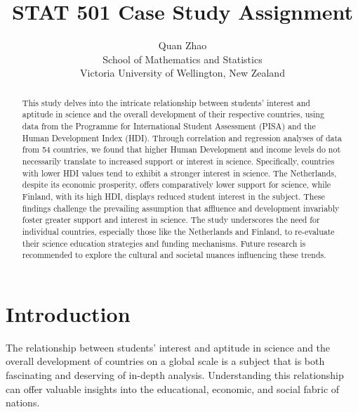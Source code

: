 \documentclass[12pt]{article}
\title{STAT 501 Case Study Assignment}
\author{Quan Zhao\\
School of Mathematics and Statistics\\ Victoria University of Wellington, New Zealand}
\begin{document}
\maketitle

\begin{abstract}
  This study delves into the intricate relationship between students' interest and aptitude in science and the overall development of their respective countries, using data from the Programme for International Student Assessment (PISA) and the Human Development Index (HDI). Through correlation and regression analyses of data from 54 countries, we found that higher Human Development and income levels do not necessarily translate to increased support or interest in science. Specifically, countries with lower HDI values tend to exhibit a stronger interest in science. The Netherlands, despite its economic prosperity, offers comparatively lower support for science, while Finland, with its high HDI, displays reduced student interest in the subject. These findings challenge the prevailing assumption that affluence and development invariably foster greater support and interest in science. The study underscores the need for individual countries, especially those like the Netherlands and Finland, to re-evaluate their science education strategies and funding mechanisms. Future research is recommended to explore the cultural and societal nuances influencing these trends.
\end{abstract}









\newpage  %
\section{Introduction}

\label{s.intro}

The relationship between students' interest and aptitude in science and the overall development of countries on a global scale is a subject that is both fascinating and deserving of in-depth analysis. Understanding this relationship can offer valuable insights into the educational, economic, and social fabric of nations.
\end{document}
